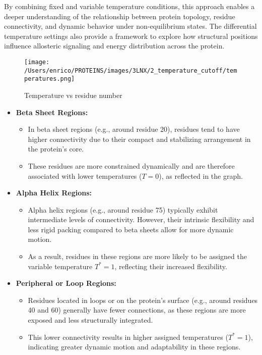 \documentclass[English, Lau, oneside]{sapthesis}
\begin{document}
By combining fixed and variable temperature conditions, this approach enables a deeper understanding of the relationship between protein topology, residue connectivity, and dynamic behavior under non-equilibrium states. The differential temperature settings also provide a framework to explore how structural positions influence allosteric signaling and energy distribution across the protein.
\begin{figure}[h!]
    \centering
    \texttt{[image: /Users/enrico/PROTEINS/images/3LNX/2\_temperature\_cutoff/temperatures.png]}
    \caption{Temperature vs residue number}
\end{figure}
\begin{itemize}
    \item \textbf{Beta Sheet Regions:}
    \begin{itemize}
        \item In beta sheet regions (e.g., around residue 20), residues tend to have higher connectivity due to their compact and stabilizing arrangement in the protein's core.
        \item These residues are more constrained dynamically and are therefore associated with lower temperatures (\(T = 0\)), as reflected in the graph.
    \end{itemize}

    \item \textbf{Alpha Helix Regions:}
    \begin{itemize}
        \item Alpha helix regions (e.g., around residue 75) typically exhibit intermediate levels of connectivity. However, their intrinsic flexibility and less rigid packing compared to beta sheets allow for more dynamic motion.
        \item As a result, residues in these regions are more likely to be assigned the variable temperature \(T^* = 1\), reflecting their increased flexibility.
    \end{itemize}

    \item \textbf{Peripheral or Loop Regions:}
    \begin{itemize}
        \item Residues located in loops or on the protein's surface (e.g., around residues 40 and 60) generally have fewer connections, as these regions are more exposed and less structurally integrated.
        \item This lower connectivity results in higher assigned temperatures (\(T^* = 1\)), indicating greater dynamic motion and adaptability in these regions.
    \end{itemize}


\end{itemize}
\end{document}

